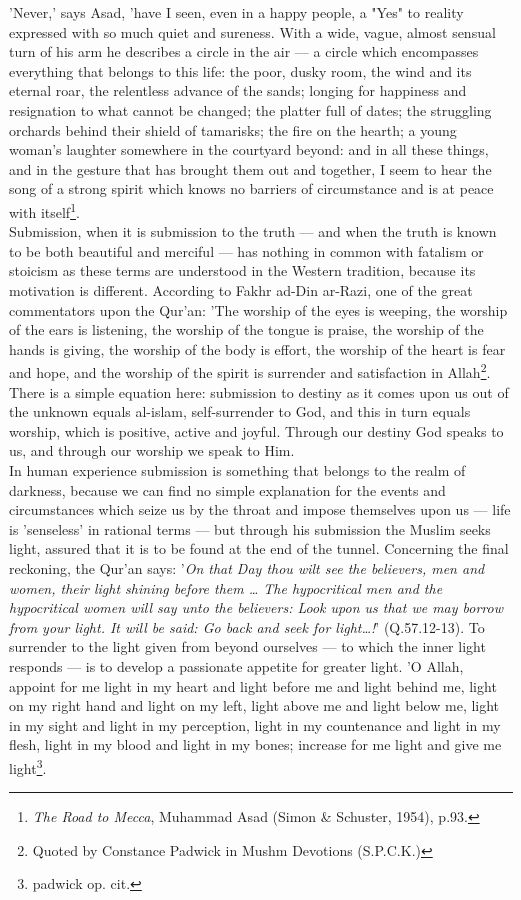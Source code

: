 \documentclass[11pt, b5paper, twoside]{book}
\begin{document}
'Never,' says Asad, 'have I seen, even in a happy people, a "Yes" to reality expressed with so much 
quiet and sureness. With a wide, vague, almost sensual turn of his arm he describes a circle in the 
air --- a circle which encompasses everything that belongs to this life: the poor, dusky room, the wind 
and its eternal roar, the relentless advance of the sands; longing for happiness and resignation to 
what cannot be changed; the platter full of dates; the struggling orchards behind their shield of 
tamarisks; the fire on the hearth; a young woman's laughter somewhere in the courtyard beyond: and in 
all these things, and in the gesture that has brought them out and together, I seem to hear the song 
of a strong spirit which knows no barriers of circumstance and is at peace with itself\footnote{\emph{The Road to Mecca}, Muhammad Asad (Simon \& Schuster, 1954), p.93.}. \\

Submission, when it is submission to the truth --- and when the truth is known to be both beautiful and 
merciful --- has nothing in common with fatalism or stoicism as these terms are understood in the 
Western tradition, because its motivation is different. According to Fakhr ad-Din ar-Razi, one of the 
great commentators upon the Qur'an: 'The worship of the eyes is weeping, the worship of the ears is 
listening, the worship of the tongue is praise, the worship of the hands is giving, the worship of 
the body is effort, the worship of the heart is fear and hope, and the worship of the spirit is 
surrender and satisfaction in Allah\footnote{Quoted by Constance Padwick in Mushm Devotions (S.P.C.K.)}. There is a simple equation here: submission to destiny as it comes upon us out of the unknown equals al-islam, self-surrender to God, and this in turn equals worship, which is positive, active and joyful. Through our destiny God speaks to us, and through our worship we speak to Him. \\

In human experience submission is something that belongs to the realm of darkness, because we can 
find no simple explanation for the events and circumstances which seize us by the throat and impose 
themselves upon us --- life is 'senseless' in rational terms --- but through his submission the Muslim 
seeks light, assured that it is to be found at the end of the tunnel. Concerning the final reckoning, 
the Qur'an says: '\emph{On that Day thou wilt see the believers, men and women, their light shining before them \ldots{} The hypocritical men and the hypocritical women will say unto the believers: Look upon us that we may borrow from your light. It will be said: Go back and seek for light\ldots{}!}' (Q.57.12-13). To surrender to the light given from beyond ourselves --- to which the inner light responds --- is to develop a passionate appetite for greater light. 'O Allah, appoint for me light in my heart and light before me and light behind me, light on my right hand and light on my left, light above me and light below me, light in my sight and light in my perception, light in my countenance and light in my flesh, light in my blood and light in my bones; increase for me light and give me light\footnote{padwick op. cit.}.\\
\end{document}
